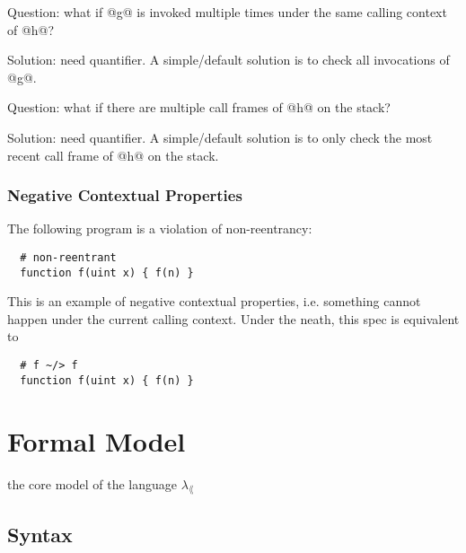 \documentclass[acmsmall,review,anonymous]{acmart}\settopmatter{printfolios=true,printccs=false,printacmref=false}
\begin{document}
Question: what if @g@ is invoked multiple times under the same calling context of
@h@?

Solution: need quantifier. A simple/default solution is to check all
invocations of @g@.

Question: what if there are multiple call frames of @h@ on the stack?

Solution: need quantifier. A simple/default solution is to only check
the most recent call frame of @h@ on the stack.


\subsubsection{Negative Contextual Properties}

The following program is a violation of non-reentrancy:

\begin{lstlisting}
  # non-reentrant
  function f(uint x) { f(n) }
\end{lstlisting}

This is an example of negative contextual properties, i.e. something cannot
happen under the current calling context. Under the neath, this spec is
equivalent to

\begin{lstlisting}
  # f ~/> f
  function f(uint x) { f(n) }
\end{lstlisting}

\section{Formal Model}

the core model of the language $\lambda_\lang$

\subsection{Syntax}
\end{document}
